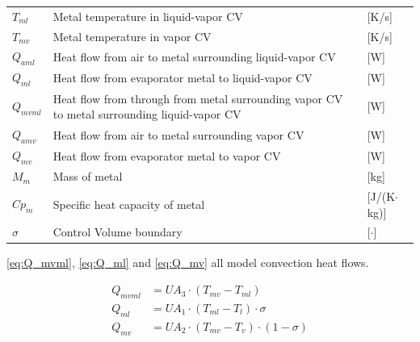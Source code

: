 \begin{center}
	\begin{tabular}{l p{10cm} l}
		$T_{ml} $  & Metal temperature in liquid-vapor CV                                                        & [\si{K}/\si{s}]                   \\[0.3cm]
		$T_{mv} $  & Metal temperature in vapor CV                                                               & [\si{K}/\si{s}]                   \\[0.3cm]
		$Q_{aml}$  & Heat flow from air to metal surrounding liquid-vapor CV                                     & [\si{W}]                          \\
		$Q_{ml}$   & Heat flow from evaporator metal to liquid-vapor CV                                          & [\si{W}]                          \\
		$Q_{mvml}$ & Heat flow from through from metal surrounding vapor CV to metal surrounding liquid-vapor CV & [\si{W}]                          \\
		$Q_{amv}$  & Heat flow from air to metal surrounding vapor CV                                            & [\si{W}]                          \\
		$Q_{mv}$   & Heat flow from evaporator metal to vapor CV                                                 & [\si{W}]                          \\
		$M_{m} $   & Mass of metal                                                                               & [\si{kg}]                         \\
		$Cp_{m}$   & Specific heat capacity of metal                                                             & [\si{J}/(\si{K}$ \cdot $\si{kg})] \\
		$\sigma$   & Control Volume boundary                                                                     & [$\cdot$]
	\end{tabular}
\end{center}

\medskip
\cref{eq:Q_mvml}, \cref{eq:Q_ml} and \cref{eq:Q_mv} all model convection heat flows.

\begin{align}
	Q_{mvml} 		& = U A_3 \cdot (T_{mv} - T_{ml}) 								\label{eq:Q_mvml} 			\\
	Q_{ml} 			& = U A_1 \cdot (T_{ml} - T_l) \cdot \sigma						\label{eq:Q_ml} 			\\
	Q_{mv} 			& = U A_2 \cdot (T_{mv} - T_v) \cdot (1- \sigma)                \label{eq:Q_mv}
\end{align}

